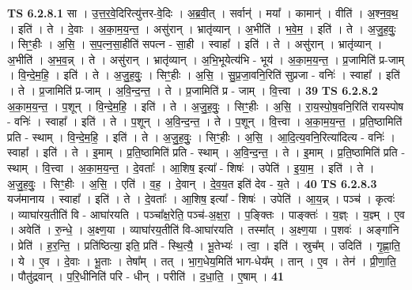 \documentclass[17pt]{extarticle}
\begin{document}
                  \newline
                       \textbf{} \newline \newline
                                \textbf{ TS 6.2.8.1} \newline
                  सा । उ॒त्त॒र॒वे॒दिरित्यु॑त्तर-वे॒दिः । अ॒ब्र॒वी॒त् । सर्वान्॑ । मया᳚ । कामान्॑ । वीति॑ । अ॒श्न॒व॒थ॒ । इति॑ । ते । दे॒वाः । अ॒का॒म॒य॒न्त॒ । असु॑रान् । भ्रातृ॑व्यान् । अ॒भीति॑ । भ॒वे॒म॒ । इति॑ । ते । अ॒जु॒ह॒वुः॒ । सिꣳ॒॒हीः । अ॒सि॒ । स॒प॒त्न॒सा॒हीति॑ सपत्न - सा॒ही । स्वाहा᳚ । इति॑ । ते । असु॑रान् । भ्रातृ॑व्यान् । अ॒भीति॑ । अ॒भ॒व॒न्न् । ते । असु॑रान् । भ्रातृ॑व्यान् । अ॒भि॒भूयेत्य॑भि - भूय॑ । अ॒का॒म॒य॒न्त॒ । प्र॒जामिति॑ प्र-जाम् । वि॒न्दे॒म॒हि॒ । इति॑ । ते । अ॒जु॒ह॒वुः॒ । सिꣳ॒॒हीः । अ॒सि॒ । सु॒प्र॒जा॒वनि॒रिति॑ सुप्रजा - वनिः॑ । स्वाहा᳚ । इति॑ । ते । प्र॒जामिति॑ प्र-जाम् । अ॒वि॒न्द॒न्त॒ । ते । प्र॒जामिति॑ प्र - जाम् । वि॒त्त्वा । \textbf{  39} \newline
                  \newline
                                \textbf{ TS 6.2.8.2} \newline
                  अ॒का॒म॒य॒न्त॒ । प॒शून् । वि॒न्दे॒म॒हि॒ । इति॑ । ते । अ॒जु॒ह॒वुः॒ । सिꣳ॒॒हीः । अ॒सि॒ । रा॒य॒स्पो॒ष॒वनि॒रिति॑ रायस्पोष - वनिः॑ । स्वाहा᳚ । इति॑ । ते । प॒शून् । अ॒वि॒न्द॒न्त॒ । ते । प॒शून् । वि॒त्त्वा । अ॒का॒म॒य॒न्त॒ । प्र॒ति॒ष्ठामिति॑ प्रति - स्थाम् । वि॒न्दे॒म॒हि॒ । इति॑ । ते । अ॒जु॒ह॒वुः॒ । सिꣳ॒॒हीः । अ॒सि॒ । आ॒दि॒त्य॒वनि॒रित्या॑दित्य - वनिः॑ । स्वाहा᳚ । इति॑ । ते । इ॒माम् । प्र॒ति॒ष्ठामिति॑ प्रति - स्थाम् । अ॒वि॒न्द॒न्त॒ । ते । इ॒माम् । प्र॒ति॒ष्ठामिति॑ प्रति - स्थाम् । वि॒त्त्वा । अ॒का॒म॒य॒न्त॒ । दे॒वताः᳚ । आ॒शिष॒ इत्या᳚ - शिषः॑ । उपेति॑ । इ॒या॒म॒ । इति॑ । ते । अ॒जु॒ह॒वुः॒ । सिꣳ॒॒हीः । अ॒सि॒ । एति॑ । व॒ह॒ । दे॒वान् । दे॒व॒य॒त इति॑ देव - य॒ते । \textbf{  40} \newline
                  \newline
                                \textbf{ TS 6.2.8.3} \newline
                  यज॑मानाय । स्वाहा᳚ । इति॑ । ते । दे॒वताः᳚ । आ॒शिष॒ इत्या᳚ - शिषः॑ । उपेति॑ । आ॒य॒न्न् । पञ्च॑ । कृत्वः॑ । व्याघा॑रय॒तीति॑ वि - आघा॑रयति । पञ्चा᳚क्ष॒रेति॒ पञ्च॑-अ॒क्ष॒रा॒ । प॒ङ्क्तिः । पाङ्क्तः॑ । य॒ज्ञ्ः । य॒ज्ञ्म् । ए॒व । अवेति॑ । रु॒न्धे॒ । अ॒क्ष्ण॒या । व्याघा॑रय॒तीति॑ वि-आघा॑रयति । तस्मा᳚त् । अ॒क्ष्ण॒या । प॒शवः॑ । अङ्गा॑नि । प्रेति॑ । ह॒र॒न्ति॒ । प्रति॑ष्ठित्या॒ इति॒ प्रति॑ - स्थि॒त्यै॒ । भू॒तेभ्यः॑ । त्वा॒ । इति॑ । स्रुच᳚म् । उदिति॑ । गृ॒ह्णा॒ति॒ । ये । ए॒व । दे॒वाः । भू॒ताः । तेषा᳚म् । तत् । भा॒ग॒धेय॒मिति॑ भाग-धेय᳚म् । तान् । ए॒व । तेन॑ । प्री॒णा॒ति॒ । पौतु॑द्रवान् । प॒रि॒धीनिति॑ परि - धीन् । परीति॑ । द॒धा॒ति॒ । ए॒षाम् । \textbf{  41} \newline
\end{document}
